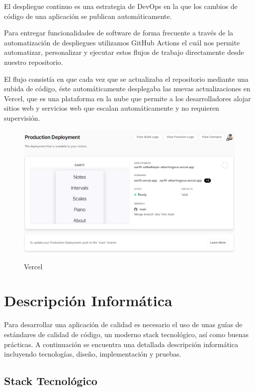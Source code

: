 \documentclass[12pt,twoside,titlepage]{report}
\begin{document}
El despliegue continuo es una estrategia de DevOps en la que los cambios de código de una aplicación se publican automáticamente.

Para entregar funcionalidades de software de forma frecuente a través de la automatización de despliegues utilizamos GitHub Actions el cuál nos permite automatizar, personalizar y ejecutar estos flujos de trabajo directamente desde nuestro repositorio.

El flujo consistía en que cada vez que se actualizaba el repositorio mediante una subida de código, éste automáticamente desplegaba las nuevas actualizaciones en Vercel, que es una plataforma en la nube que permite a los desarrolladores alojar sitios web y servicios web que escalan automáticamente y no requieren supervisión.

\begin{figure}[H]
    \centering
    \includegraphics[scale=0.54]{DevOps/Vercel}
    \label{fig:Vercel}
    \caption{Vercel}
\end{figure}

\chapter{Descripción Informática}

Para desarrollar una aplicación de calidad es necesario el uso de unas guías de estándares de calidad de código, un moderno stack tecnológico, así como buenas prácticas. A continuación se encuentra una detallada descripción informática incluyendo tecnologías, diseño, implementación y pruebas.

\section{Stack Tecnológico}
\end{document}

